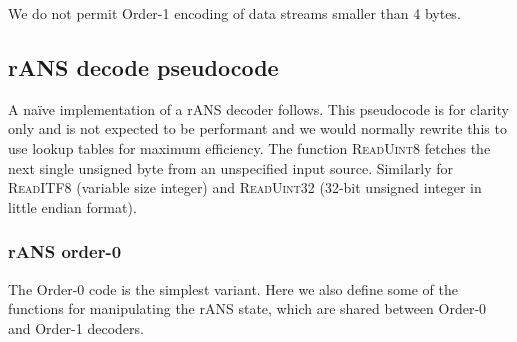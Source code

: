 \documentclass[a4paper]{article}
\begin{document}
We do not permit Order-1 encoding of data streams smaller than 4
bytes.

\subsection{rANS decode pseudocode}

A na\"ive implementation of a rANS decoder follows.
This pseudocode is for clarity only and is not expected to be performant and we would normally rewrite this to use lookup tables for maximum efficiency.
The function \textsc{ReadUint8} fetches the next single unsigned byte from an unspecified input source.  Similarly for \textsc{ReadITF8} (variable size integer) and \textsc{ReadUint32} (32-bit unsigned integer in little endian format).

\vskip 0.5cm

\begin{algorithmic}[1]
\settowidth{\maxwidth}{$n\_out$}
\State {} 
\State {} 
\State {} 
\State {}
  \State {}
\Else
  \State {}
\EndIf
\EndProcedure
\end{algorithmic}


\subsubsection*{rANS order-0}

The Order-0 code is the simplest variant.
Here we also define some of the functions for manipulating the rANS state, which are shared between Order-0 and Order-1 decoders.

\vskip 0.5cm
\end{document}
